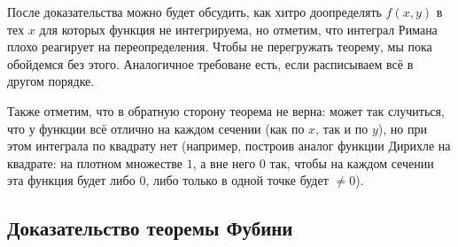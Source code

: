\documentclass[12pt]{article}
\theoremstyle{definition}
\begin{document}
После доказательства можно будет обсудить, как хитро доопределять $f(x,y)$ в тех $x$ для которых функция не интегрируема, но отметим, что интеграл Римана плохо реагирует на переопределения. Чтобы не перегружать теорему, мы пока обойдемся без этого. Аналогичное требоване есть, если расписываем всё в другом порядке.

Также отметим, что в обратную сторону теорема не верна: может так случиться, что у функции всё отлично на каждом сечении (как по $x$, так и по $y$), но при этом интеграла по квадрату нет (например, построив аналог функции Дирихле на квадрате: на плотном множестве $1$, а вне него $0$ так, чтобы на каждом сечении 
эта функция будет либо $0$, либо только в одной точке будет $\neq 0$).

\subsection*{Доказательство теоремы Фубини}
\end{document}

